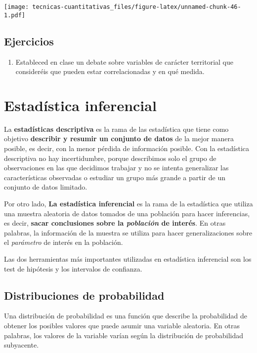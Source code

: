 \documentclass[
]{book}
\providecommand{\tightlist}{%
  \setlength{\itemsep}{0pt}\setlength{\parskip}{0pt}}
\begin{document}
\texttt{[image: tecnicas-cuantitativas\_files/figure-latex/unnamed-chunk-46-1.pdf]}

\hypertarget{ejercicios}{%
\section{Ejercicios}\label{ejercicios}}

\begin{enumerate}
\def\labelenumi{\arabic{enumi}.}
\tightlist
\item
  Estableced en clase un debate sobre variables de carácter territorial que consideréis que pueden estar correlacionadas y en qué medida.
\end{enumerate}

\hypertarget{estaduxedstica-inferencial}{%
\chapter{Estadística inferencial}\label{estaduxedstica-inferencial}}

La \textbf{estadísticas descriptiva} es la rama de las estadística que tiene como objetivo \textbf{describir y resumir un conjunto de datos} de la mejor manera posible, es decir, con la menor pérdida de información posible. Con la estadística descriptiva no hay incertidumbre, porque describimos solo el grupo de observaciones en las que decidimos trabajar y no se intenta generalizar las características observadas o estudiar un grupo más grande a partir de un conjunto de datos limitado.

Por otro lado, \textbf{La estadística inferencial} es la rama de la estadística que utiliza una muestra aleatoria de datos tomados de una población para hacer inferencias, es decir, \textbf{sacar conclusiones sobre la \emph{población} de interés}. En otras palabras, la información de la muestra se utiliza para hacer generalizaciones sobre el \emph{parámetro} de interés en la población.

Las dos herramientas más importantes utilizadas en estadística inferencial son los test de hipótesis y los intervalos de confianza.

\hypertarget{distribuciones-de-probabilidad}{%
\section{Distribuciones de probabilidad}\label{distribuciones-de-probabilidad}}

Una distribución de probabilidad es una función que describe la probabilidad de obtener los posibles valores que puede asumir una variable aleatoria. En otras palabras, los valores de la variable varían según la distribución de probabilidad subyacente.
\end{document}
